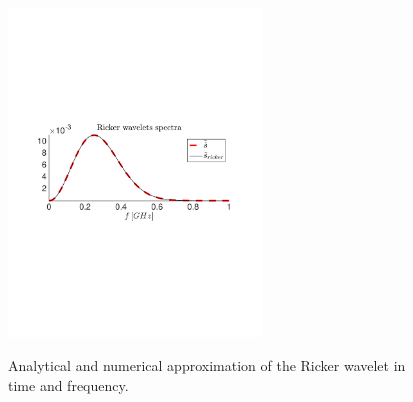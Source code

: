 \documentclass[a4paper,12pt]{article}
\begin{document}
\begin{figure}[!h]
\includegraphics[trim={60 280 60 280},clip,width=0.6\textwidth]{pics/ricker-spectra.pdf}
\label{fig:ricker}
\caption{Analytical and numerical approximation of the Ricker wavelet in time and frequency.}
\end{figure}
%


\end{document}
